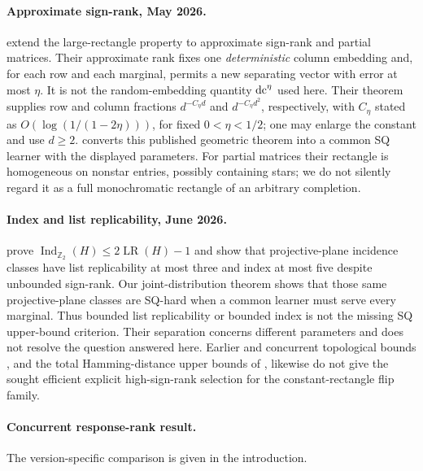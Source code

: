 \paragraph{Approximate sign-rank, May 2026.}
\citet[Theorem~1.3]{BHKR26} extend the large-rectangle property to approximate sign-rank and partial matrices. Their approximate rank fixes one \emph{deterministic} column embedding and, for each row and each marginal, permits a new separating vector with error at most $\eta$. It is not the random-embedding quantity $\operatorname{dc}^\eta$ used here. Their theorem supplies row and column fractions $d^{-C_\eta d}$ and $d^{-C_\eta d^2}$, respectively, with $C_\eta$ stated as $O(\log(1/(1-2\eta)))$, for fixed $0<\eta<1/2$; one may enlarge the constant and use $d\ge2$.  converts this published geometric theorem into a common SQ learner with the displayed parameters. For partial matrices their rectangle is homogeneous on nonstar entries, possibly containing stars; we do not silently regard it as a full monochromatic rectangle of an arbitrary completion.

\paragraph{Index and list replicability, June 2026.}
\citet{BHHLT26} prove $\operatorname{Ind}_{\mathbb Z_2}(H)\le2\operatorname{LR}(H)-1$ and show that projective-plane incidence classes have list replicability at most three and index at most five despite unbounded sign-rank. Our joint-distribution theorem shows that those same projective-plane classes are SQ-hard when a common learner must serve every marginal. Thus bounded list replicability or bounded index is not the missing SQ upper-bound criterion. Their separation concerns different parameters and does not resolve the question answered here. Earlier and concurrent topological bounds \citep{HHM23,FHV26}, and the total Hamming-distance upper bounds of \citet{GHIS25}, likewise do not give the sought efficient explicit high-sign-rank selection for the constant-rectangle flip family.

\paragraph{Concurrent response-rank result.}
The version-specific comparison is given in the introduction.

